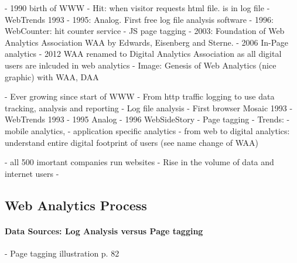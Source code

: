 

- 1990 birth of WWW
- Hit: when visitor requests html file. is in log file
- WebTrends 1993
- 1995: Analog. First free log file analysis software
- 1996: WebCounter: hit counter service
- JS page tagging
- 2003: Foundation of Web Analytics Association WAA by Edwards, Eisenberg and Sterne.
- 2006 In-Page analytics
- 2012 WAA renamed to Digital Analytics Association as all digital users are inlcuded in web analytics
- Image: Genesis of Web Analytics (nice graphic) with WAA, DAA



- Ever growing since start of WWW
- From http traffic logging to use data tracking, analysis and reporting
- Log file analysis
- First browser Mosaic 1993
- WebTrends 1993
- 1995 Analog
- 1996 WebSideStory
- Page tagging
- Trends:
- mobile analytics,
- application specific analytics
- from web to digital analytics: understand entire digital footprint of users (see name change of WAA)



- all 500 imortant companies run websites
- Rise in the volume of data and internet users
- 


\subsection{Web Analytics Process}






\paragraph{Data Sources: Log Analysis versus Page tagging}


- Page tagging illustration p. 82








